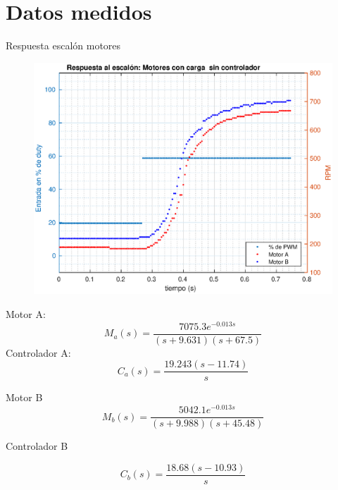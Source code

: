 \documentclass[10pt,conference,a4paper,onecolumn]{article}%
\begin{document}
\section{Datos medidos}
Respuesta escalón motores


\begin{figure}[h]
\centering
\includegraphics[width=15cm]{./imagenes/resp_escalon_motores_2}
\end{figure}
Motor A:
\begin{equation}
M_a(s)= \frac{7075.3 e^{-0.013s}}{(s+9.631)(s+67.5)}
\end{equation}
Controlador A:
\begin{equation}
C_a(s)= \frac{  19.243 (s-11.74)}{s}
\end{equation}


Motor B
\begin{equation}
M_b(s)= \frac{5042.1 e^{-0.013s}}{(s+9.988) (s+45.48)}
\end{equation}

Controlador B

\begin{equation}
C_b(s)= \frac{ 18.68 (s-10.93)}{s}
\end{equation}
\end{document}
